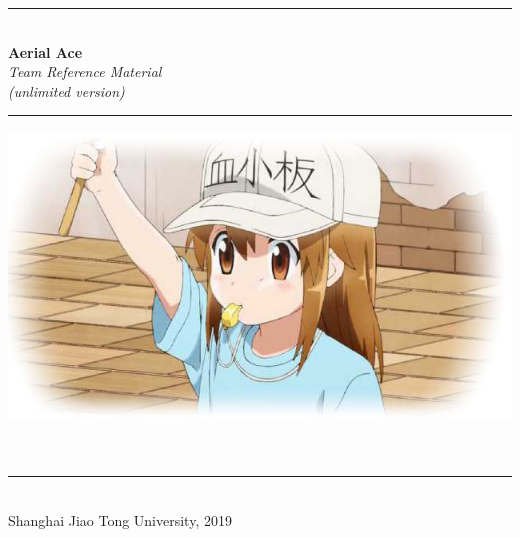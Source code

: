 \documentclass[titlepage, openany]{book}
\begin{document}
    \begin{titlepage}
        \centering
        \rule{\linewidth}{0.5mm}\\[0.4cm]
        {\Huge\bfseries Aerial Ace}\\[\baselineskip]
        {\textit {\Large Team Reference Material}}\\
        {\textit {\small (unlimited version)}}\\[0.4cm]
        \rule{\linewidth}{0.5mm}
        \vfill
        \includegraphics[scale=0.4]{Platelet.jpg}
        \vfill
        \\[0.1cm]
        \\[0.1cm]
        \\[0.4cm]
        \rule{\linewidth}{0.3mm}\\[0.4cm]
        \small{Shanghai Jiao Tong University, 2019}
    \end{titlepage}

    \cleardoublepage
    \setcounter{page}{1}
    \tableofcontents
    \cleardoublepage
    \setcounter{page}{1}
\end{document}
